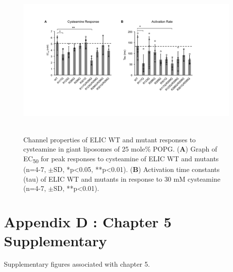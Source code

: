 \documentclass[12pt]{ruthesis_nofloat}
\begin{document}
\renewcommand{\thefigure}{C7}
\begin{figure}

\includegraphics[width=6.43181in,height=3.12778in]{./pandoc_test/media/image17.pdf}

\caption[Channel properties of ELIC WT and mutant responses to cysteamine in giant liposomes of 25 mole\% POPG.] {Channel properties of ELIC WT and mutant
responses to cysteamine in giant liposomes of 25 mole\% POPG.
(\textbf{A}) Graph of EC\textsubscript{50} for peak responses to
cysteamine of ELIC WT and mutants (n=4-7, $\pm$SD, *p\textless{}0.05,
**p\textless{}0.01). (\textbf{B}) Activation time constants (tau) of
ELIC WT and mutants in response to 30 mM cysteamine (n=4-7, $\pm$SD,
**p\textless{}0.01).} \label{fig:Supplementary Fig. 7}
\end{figure}


\section*{Appendix D : Chapter 5 Supplementary}
Supplementary figures associated with chapter 5.
\end{document}
